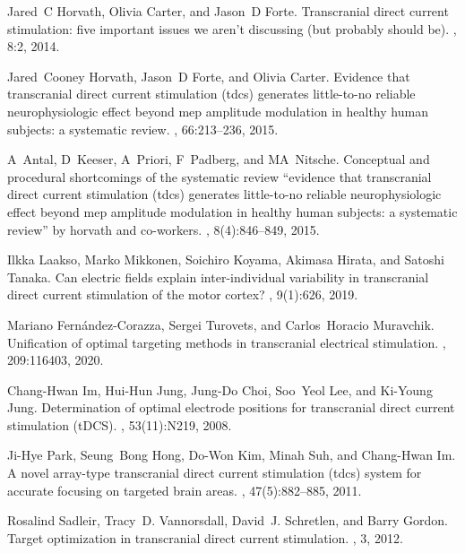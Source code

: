 \begin{thebibliography}{10}
Jared~C Horvath, Olivia Carter, and Jason~D Forte.
\newblock Transcranial direct current stimulation: five important issues we aren't discussing (but probably should be).
, 8:2, 2014.

Jared~Cooney Horvath, Jason~D Forte, and Olivia Carter.
\newblock Evidence that transcranial direct current stimulation (tdcs) generates little-to-no reliable neurophysiologic effect beyond mep amplitude modulation in healthy human subjects: a systematic review.
, 66:213--236, 2015.

A~Antal, D~Keeser, A~Priori, F~Padberg, and MA~Nitsche.
\newblock Conceptual and procedural shortcomings of the systematic review “evidence that transcranial direct current stimulation (tdcs) generates little-to-no reliable neurophysiologic effect beyond mep amplitude modulation in healthy human subjects: a systematic review” by horvath and co-workers.
, 8(4):846--849, 2015.

Ilkka Laakso, Marko Mikkonen, Soichiro Koyama, Akimasa Hirata, and Satoshi Tanaka.
\newblock Can electric fields explain inter-individual variability in transcranial direct current stimulation of the motor cortex?
, 9(1):626, 2019.

Mariano Fernández-Corazza, Sergei Turovets, and Carlos~Horacio Muravchik.
\newblock Unification of optimal targeting methods in transcranial electrical stimulation.
, 209:116403, 2020.

Chang-Hwan Im, Hui-Hun Jung, Jung-Do Choi, Soo~Yeol Lee, and Ki-Young Jung.
\newblock Determination of optimal electrode positions for transcranial direct current stimulation ({tDCS}).
, 53(11):N219, 2008.

Ji-Hye Park, Seung~Bong Hong, Do-Won Kim, Minah Suh, and Chang-Hwan Im.
\newblock A novel array-type transcranial direct current stimulation (tdcs) system for accurate focusing on targeted brain areas.
, 47(5):882--885, 2011.

Rosalind Sadleir, Tracy~D. Vannorsdall, David~J. Schretlen, and Barry Gordon.
\newblock Target optimization in transcranial direct current stimulation.
, 3, 2012.


\end{thebibliography}
